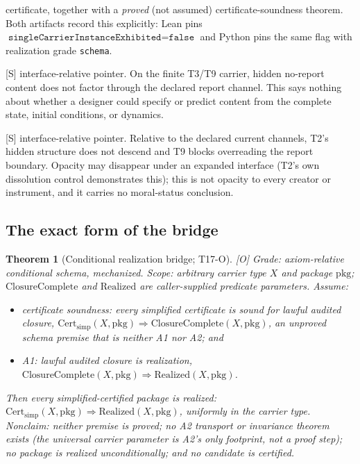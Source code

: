 \documentclass[11pt]{article}
\newcommand{\gradeS}{\textsf{[S]}}
\newcommand{\gradeO}{\textsf{[O]}}
\newcommand{\Certsimp}{\mathrm{Cert}_{\mathrm{simp}}}
\newtheorem{theorem}{Theorem}[section]
\theoremstyle{definition}
\begin{document}
\begin{description}
certificate, together with a \emph{proved} (not assumed) certificate-soundness
theorem. Both artifacts record this explicitly: Lean pins
$\texttt{singleCarrierInstanceExhibited}=\texttt{false}$ and Python pins the
same flag with realization grade \texttt{schema}.
\item[T17a (report-interface pointer).] \gradeS{} interface-relative pointer.
On the finite T3/T9 carrier, hidden no-report content does not factor through
the declared report channel. This says nothing about whether a designer could
specify or predict content from the complete state, initial conditions, or
dynamics.
\item[T17b (declared-interface opacity pointer).] \gradeS{}
interface-relative pointer. Relative to the declared current channels, T2's
hidden structure does not descend and T9 blocks overreading the report
boundary. Opacity may disappear under an expanded interface (T2's own
dissolution control demonstrates this); this is not opacity to every creator
or instrument, and it carries no moral-status conclusion.
\end{description}

\subsection{The exact form of the bridge}

\begin{theorem}[Conditional realization bridge; T17-O]
\label{thm:t17o}
\gradeO{} \emph{Grade:} axiom-relative conditional schema, mechanized.
\emph{Scope:} arbitrary carrier type $X$ and package $\mathrm{pkg}$;
$\mathrm{ClosureComplete}$ and $\mathrm{Realized}$ are caller-supplied
predicate parameters. Assume:
\begin{itemize}
\item[(H1)] \emph{certificate soundness}: every simplified certificate is
sound for lawful audited closure,
$\Certsimp(X, \mathrm{pkg}) \Rightarrow \mathrm{ClosureComplete}(X,
\mathrm{pkg})$, an unproved schema premise that is neither A1 nor A2; and
\item[(H2)] \emph{A1}: lawful audited closure is realization,
$\mathrm{ClosureComplete}(X, \mathrm{pkg}) \Rightarrow
\mathrm{Realized}(X, \mathrm{pkg})$.
\end{itemize}
Then every simplified-certified package is realized:
$\Certsimp(X, \mathrm{pkg}) \Rightarrow \mathrm{Realized}(X, \mathrm{pkg})$,
uniformly in the carrier type. \emph{Nonclaim:} neither premise is proved;
no A2 transport or invariance theorem exists (the universal carrier parameter
is A2's only footprint, not a proof step); no package is realized
unconditionally; and no candidate is certified.
\end{theorem}
\end{document}
